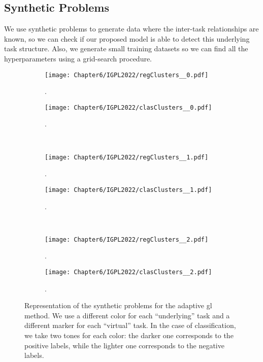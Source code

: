 \subsection{Synthetic Problems}
%
We use synthetic problems to generate data where the inter-task relationships are known, so we can check if our proposed model is able to detect this underlying task structure.
%
Also, we generate small training datasets so we can find all the hyperparameters using a grid-search procedure.



\begin{figure}[t!]
    \centering
    \begin{subfigure}[b]{0.49\textwidth}
        \centering
        \texttt{[image: Chapter6/IGPL2022/regClusters\_\_0.pdf]}
        \caption{.}
        \label{regClusters0}
    \end{subfigure}
    \hfill
    \begin{subfigure}[b]{0.49\textwidth}
        \centering
        \texttt{[image: Chapter6/IGPL2022/clasClusters\_\_0.pdf]}
        \caption{.}
        \label{clasClusters0}
    \end{subfigure}
    \\
    \begin{subfigure}[b]{0.49\textwidth}
        \centering
        \texttt{[image: Chapter6/IGPL2022/regClusters\_\_1.pdf]}
        \caption{.}
        \label{regClusters1}
    \end{subfigure}
    \hfill
    \begin{subfigure}[b]{0.49\textwidth}
        \centering
        \texttt{[image: Chapter6/IGPL2022/clasClusters\_\_1.pdf]}
        \caption{.}
        \label{clasClusters1}
    \end{subfigure}
    \\
    \begin{subfigure}[b]{0.49\textwidth}
        \centering
        \texttt{[image: Chapter6/IGPL2022/regClusters\_\_2.pdf]}
        \caption{.}
        \label{regClusters2}
    \end{subfigure}
    \hfill
    \begin{subfigure}[b]{0.49\textwidth}
        \centering
        \texttt{[image: Chapter6/IGPL2022/clasClusters\_\_2.pdf]}
        \caption{.}
        \label{clasClusters2}
    \end{subfigure}
    \caption[Representation of the synthetic problems for the adaptive \acrshort{gl} method.]{Representation of the synthetic problems for the adaptive \acrshort{gl} method. We use a different color for each ``underlying'' task and a different marker for each ``virtual'' task. In the case of classification, we take two tones for each color: the darker one corresponds to the positive labels, while the lighter one corresponds to the negative labels.}
\end{figure}

